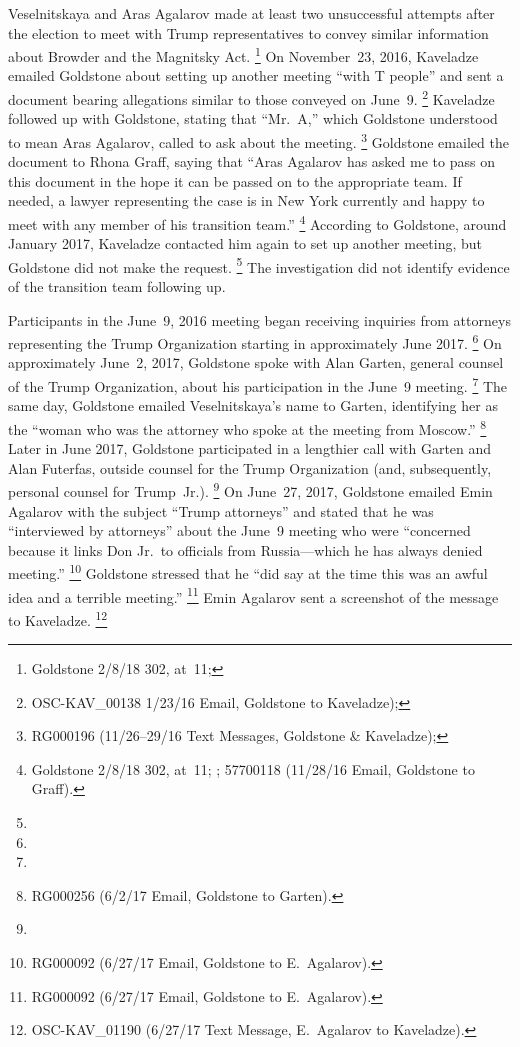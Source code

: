 Veselnitskaya and Aras Agalarov made at least two unsuccessful attempts after the election to meet with Trump representatives to convey similar information about Browder and the Magnitsky Act.%
\footnote{Goldstone 2/8/18 302, at~11; }
On November~23, 2016, Kaveladze emailed Goldstone about setting up another meeting ``with T people'' and sent a document bearing allegations similar to those conveyed on June~9.%
\footnote{OSC-KAV\_00138 1/23/16 Email, Goldstone to Kaveladze); }
Kaveladze followed up with Goldstone, stating that ``Mr.~A,'' which Goldstone understood to mean Aras Agalarov, called to ask about the meeting.%
\footnote{RG000196 (11/26--29/16 Text Messages, Goldstone \& Kaveladze); }
Goldstone emailed the document to Rhona Graff, saying that ``Aras Agalarov has asked me to pass on this document in the hope it can be passed on to the appropriate team.
If needed, a lawyer representing the case is in New York currently and happy to meet with any member of his transition team.''%
\footnote{Goldstone 2/8/18 302, at~11; ; 57700118 (11/28/16 Email, Goldstone to Graff).}
According to Goldstone, around January 2017, Kaveladze contacted him again to set up another meeting, but Goldstone did not make the request.%
\footnote{}
The investigation did not identify evidence of the transition team following up.

Participants in the June~9, 2016 meeting began receiving inquiries from attorneys representing the Trump Organization starting in approximately June 2017.%
\footnote{}
On approximately June~2, 2017, Goldstone spoke with Alan Garten, general counsel of the Trump Organization, about his participation in the June~9 meeting.%
\footnote{}
The same day, Goldstone emailed Veselnitskaya's name to Garten, identifying her as the ``woman who was the attorney who spoke at the meeting from Moscow.''%
\footnote{RG000256 (6/2/17 Email, Goldstone to Garten).}
Later in June 2017, Goldstone participated in a lengthier call with Garten and Alan Futerfas, outside counsel for the Trump Organization (and, subsequently, personal counsel for Trump~Jr.).%
\footnote{}
On June~27, 2017, Goldstone emailed Emin Agalarov with the subject ``Trump attorneys'' and stated that he was ``interviewed by attorneys'' about the June~9 meeting who were ``concerned because it links Don Jr.\ to officials from Russia---which he has always denied meeting.''%
\footnote{RG000092 (6/27/17 Email, Goldstone to E.~Agalarov).}
Goldstone stressed that he ``did say at the time this was an awful idea and a terrible meeting.''%
\footnote{RG000092 (6/27/17 Email, Goldstone to E.~Agalarov). }
Emin Agalarov sent a screenshot of the message to Kaveladze.%
\footnote{OSC-KAV\_01190 (6/27/17 Text Message, E.~Agalarov to Kaveladze).}

